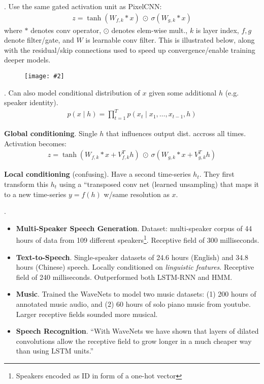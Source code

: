 \documentclass[11pt]{article}
\newcommand\myfig[2][0.3\textwidth]{\begin{figure}[h!]\centering\texttt{[image: \#2]}\end{figure}}
\newcommand\myspace[1][]{\vspace{#1\bigskipamount}}
\newcommand\p{\Needspace{10\baselineskip} \noindent}
\begin{document}
\myspace
\p {}. Use the same gated activation unit as PixelCNN:
\begin{align}
z = \tanh\left( W_{f,k} * x \right) ~ \odot ~ \sigma\left( W_{g,k} * x \right)
\end{align}
where $*$ denotes conv operator, $\odot$ denotes elem-wise mult., $k$ is layer index, $f,g$ denote filter/gate, and $W$ is learnable conv filter. This is illustrated below, along with the residual/skip connections used to speed up convergence/enable training deeper models.

\myfig[0.6\textwidth]{WaveNetRes.PNG}

\myspace
\p {}. Can also model conditional distribution of $x$ given some additional $h$ (e.g. speaker identity).
\begin{align}
p(x \mid h) = \prod_{t = 1}^{T} p(x_t \mid x_1, \ldots, x_{t - 1}, h)
\end{align}
\begin{compactitem}[$\rightarrow$]
	\item \textbf{Global conditioning}. Single $h$ that influences output dist. accross all times. Activation becomes:
	\begin{align}
	z = \tanh\left( W_{f,k} * x +  V_{f,k}^T h\right) 
		~ \odot ~ 
		\sigma\left( W_{g,k} * x + V_{g,k}^T h\right)
	\end{align}
	
	\item \textbf{Local conditioning} (confusing). Have a second time-series $h_t$. They first transform this $h_t$ using a ``transposed conv net (learned unsampling) that maps it to a new time-series $y = f(h)$ w/same resolution as $x$. 
\end{compactitem}




\myspace
\p {}. 
\begin{itemize}
	\item \textbf{Multi-Speaker Speech Generation}. Dataset: multi-speaker corpus of 44 hours of data from 109 different speakers\footnote{Speakers encoded as ID in form of a one-hot vector}. Receptive field of 300 milliseconds.
	
	
	\item \textbf{Text-to-Speech}. Single-speaker datasets of 24.6 hours (English) and 34.8 hours (Chinese) speech. Locally conditioned on \textit{linguistic features}. Receptive field of 240 milliseconds. Outperformed both LSTM-RNN and HMM.
	
	
	\item \textbf{Music}. Trained the WaveNets to model two music datasets: (1) 200 hours of annotated music audio, and (2) 60 hours of solo piano music from youtube. Larger receptive fields sounded more musical.
	
	\item \textbf{Speech Recognition}. ``With WaveNets we have shown that layers of dilated convolutions allow the receptive field to grow longer in a much cheaper way than using LSTM units.''
\end{itemize}
\end{document}
